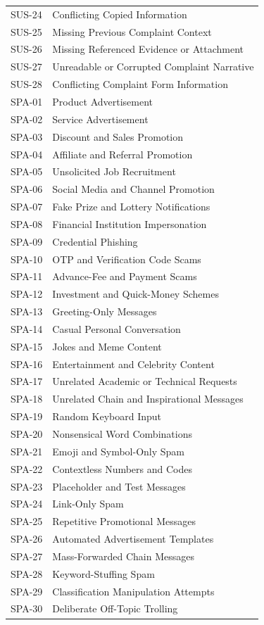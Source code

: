 \begin{longtable}{p{}p{}}
SUS-24 & Conflicting Copied Information\\
SUS-25 & Missing Previous Complaint Context\\
SUS-26 & Missing Referenced Evidence or Attachment\\
SUS-27 & Unreadable or Corrupted Complaint Narrative\\
SUS-28 & Conflicting Complaint Form Information\\
SPA-01 & Product Advertisement\\
SPA-02 & Service Advertisement\\
SPA-03 & Discount and Sales Promotion\\
SPA-04 & Affiliate and Referral Promotion\\
SPA-05 & Unsolicited Job Recruitment\\
SPA-06 & Social Media and Channel Promotion\\
SPA-07 & Fake Prize and Lottery Notifications\\
SPA-08 & Financial Institution Impersonation\\
SPA-09 & Credential Phishing\\
SPA-10 & OTP and Verification Code Scams\\
SPA-11 & Advance-Fee and Payment Scams\\
SPA-12 & Investment and Quick-Money Schemes\\
SPA-13 & Greeting-Only Messages\\
SPA-14 & Casual Personal Conversation\\
SPA-15 & Jokes and Meme Content\\
SPA-16 & Entertainment and Celebrity Content\\
SPA-17 & Unrelated Academic or Technical Requests\\
SPA-18 & Unrelated Chain and Inspirational Messages\\
SPA-19 & Random Keyboard Input\\
SPA-20 & Nonsensical Word Combinations\\
SPA-21 & Emoji and Symbol-Only Spam\\
SPA-22 & Contextless Numbers and Codes\\
SPA-23 & Placeholder and Test Messages\\
SPA-24 & Link-Only Spam\\
SPA-25 & Repetitive Promotional Messages\\
SPA-26 & Automated Advertisement Templates\\
SPA-27 & Mass-Forwarded Chain Messages\\
SPA-28 & Keyword-Stuffing Spam\\
SPA-29 & Classification Manipulation Attempts\\
SPA-30 & Deliberate Off-Topic Trolling\\
\bottomrule\end{longtable}\normalsize
